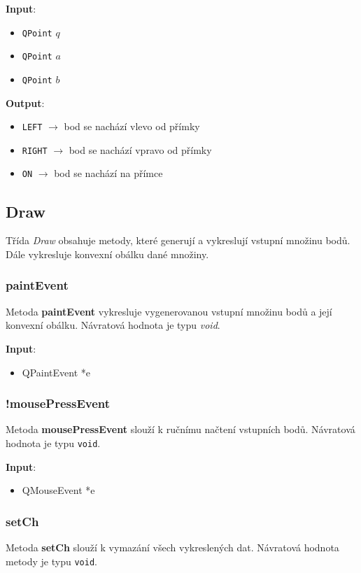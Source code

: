 \documentclass[a4paper, 12pt]{article}
\begin{document}
\textbf{Input}:
\begin{itemize}
\item \texttt{QPoint} $q$
\item \texttt{QPoint} $a$
\item \texttt{QPoint} $b$
\end{itemize}

\textbf{Output}:
\begin{itemize}
\item \texttt{LEFT} $\rightarrow$ bod se nachází vlevo od přímky
\item \texttt{RIGHT} $\rightarrow$ bod se nachází vpravo od přímky
\item \texttt{ON} $\rightarrow$ bod se nachází na přímce
\end{itemize}

\subsection{Draw}
Třída \textit{Draw} obsahuje metody, které generují a vykreslují vstupní množinu bodů. Dále vykresluje konvexní obálku dané množiny. 

\subsubsection{paintEvent}
Metoda \textbf{paintEvent} vykresluje vygenerovanou vstupní množinu bodů a její konvexní obálku. Návratová hodnota je typu \textit{void}.

\textbf{Input}:
\begin{itemize}
\item QPaintEvent *e
\end{itemize}

\subsubsection{!mousePressEvent}
Metoda \textbf{mousePressEvent} slouží k ručnímu načtení vstupních bodů. Návratová hodnota je typu \texttt{void}.

\textbf{Input}:
\begin{itemize}
\item QMouseEvent *e
\end{itemize}

\subsubsection{setCh}
Metoda \textbf{setCh} slouží k vymazání všech vykreslených dat. Návratová hodnota metody je typu \texttt{void}.
\end{document}
